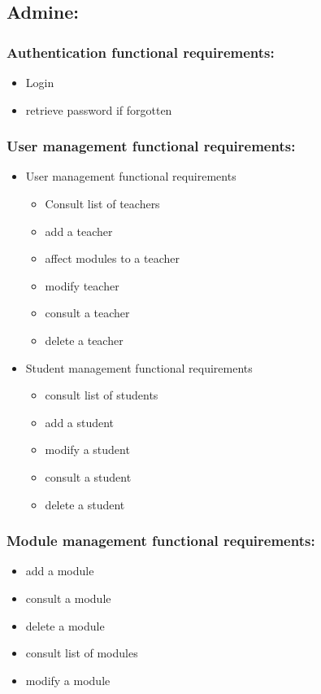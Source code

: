 \documentclass[a4paper,12p]{article}
\begin{document}
     \subsection{Admine: }
     \subsubsection{Authentication functional requirements:}
     \begin{itemize}
         \item Login
         \item retrieve password if forgotten
     \end{itemize}

     \subsubsection{User management functional requirements:}
     \begin{itemize}

         \item User management functional requirements
         \begin{itemize}
             \item Consult list of teachers
             \item add a teacher
             \item affect modules to a teacher
             \item modify teacher
             \item consult a teacher
             \item delete a teacher
         \end{itemize}

         \item Student management functional requirements
         \begin{itemize}
             \item consult list of students
             \item add a student
             \item modify a student
             \item consult a student
             \item delete a student
         \end{itemize}

     \end{itemize}

     \subsubsection{Module management functional requirements:}
     \begin{itemize}
         \item add a module
         \item consult a module
         \item delete a module
         \item consult list of modules
         \item modify a module
     \end{itemize}
\end{document}
